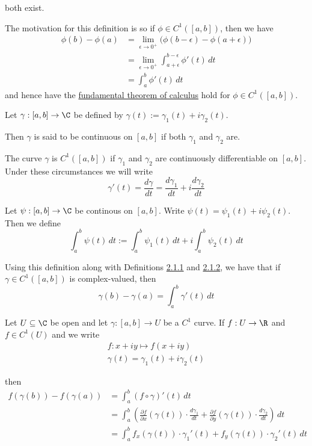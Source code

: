 both exist.

The motivation for this definition is so if $\phi\in C^1([a,b])$, then we have
\begin{align*}
  \phi(b)-\phi(a)
   & =\lim_{\epsilon\to0^+}\big(\phi(b-\epsilon)-\phi(a+\epsilon)\big) \\
   & =\lim_{\epsilon\to0^+}\int_{a+\epsilon}^{b-\epsilon}\phi'(t)\,dt  \\
   & =\int_a^b\phi'(t)\,dt
\end{align*}
and hence have the \href{b869dc0}{fundamental theorem of calculus}
hold for $\phi\in C^1([a,b])$.

\label{e4132bc}

Let $\gamma:[a,b]\to\C$ be defined by $\gamma(t):=\gamma_1(t) + i\gamma_2(t)$.

Then $\gamma$ is said to be continuous on $[a,b]$ if both $\gamma_1$ and
$\gamma_2$ are.

The curve $\gamma$ is $C^1([a,b])$ if $\gamma_1$ and $\gamma_2$ are
continuously differentiable on $[a,b]$. Under these circumstances we will write
$$
  \gamma'(t)=\frac{d\gamma}{dt}=\frac{d\gamma_1}{dt}+i\frac{d\gamma_2}{dt}
$$

\label{c511702}

Let $\psi:[a,b]\to\C$ be continous on $[a,b]$. Write
$\psi(t)=\psi_1(t)+i\psi_2(t)$. Then we define
$$
  \int_a^b\psi(t)\,dt:=\int_a^b\psi_1(t)\,dt+i\int_a^b\psi_2(t)\,dt
$$

Using this definition along with Definitions \href{c1f6d35}{2.1.1} and
\href{e4132bc}{2.1.2}, we have that if $\gamma\in C^1([a,b])$ is
complex-valued, then
$$
  \gamma(b)-\gamma(a)=\int_a^b\gamma'(t)\,dt
$$

\label{f37b676}

Let $U\subseteq\C$ be open and let $\gamma:[a,b]\to U$ be a $C^1$ curve. If
$f:U\to\R$ and $f\in C^1(U)$ and we write
\begin{gather*}
  f:x+iy\mapsto f(x+iy) \\
  \gamma(t)=\gamma_1(t)+i\gamma_2(t)
\end{gather*}

then
\begin{align*}
  f(\gamma(b))-f(\gamma(a))
   & =\int_a^b (f\circ\gamma)'(t)\,dt \\
   & =\int_a^b\left(
  \frac{\partial f}{\partial x}(\gamma(t))\cdot\frac{d\gamma_1}{dt}+
  \frac{\partial f}{\partial y}(\gamma(t))\cdot\frac{d\gamma_2}{dt}
  \right)\,dt                         \\
   & =\int_a^b
  f_x(\gamma(t))\cdot\gamma_1'(t)+f_y(\gamma(t))\cdot\gamma_2'(t)
  \,dt
\end{align*}

